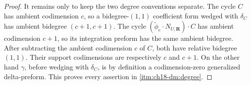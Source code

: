 \begin{proof}
It remains only to keep the two degree conventions separate.  The cycle
\(C\) has ambient codimension \(c\), so a bidegree-\((1,1)\) coefficient
form wedged with \(\delta_C\) has ambient bidegree
\((c+1,c+1)\).  The cycle
\((\widetilde\phi_e\cdot N_{U,\mathbf R})\cdot C\) has ambient codimension
\(c+1\), so its integration preform has the same ambient bidegree.  After
subtracting the ambient codimension \(c\) of \(C\), both have relative
bidegree \((1,1)\).  Their support codimensions are respectively \(c\) and
\(c+1\).  On the other hand \(\gamma\), before wedging with
\(\delta_C\), is by definition a codimension-zero generalized
delta-preform.  This proves every assertion in
\cref{itm:ch18-dm:degree}.
\end{proof}

